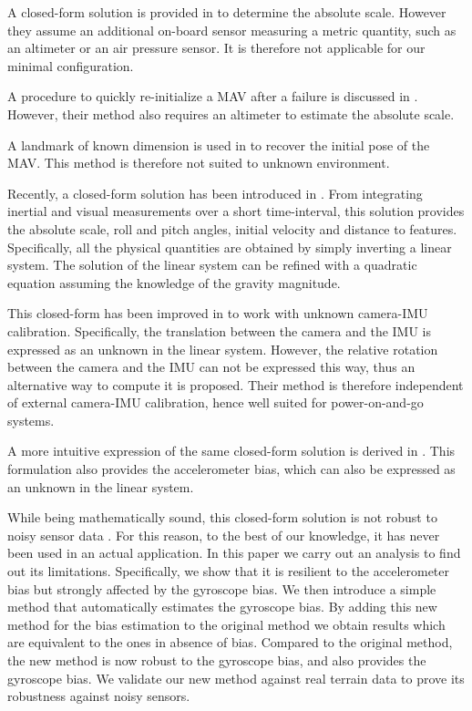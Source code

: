 \documentclass[letterpaper, 10 pt, conference]{ieeeconf}  %
\begin{document}


A closed-form solution is provided in \cite{Engel2013} to determine the absolute scale.
However they assume an additional on-board sensor measuring a metric quantity, such as an altimeter or an air pressure sensor.
It is therefore not applicable for our minimal configuration.

A procedure to quickly re-initialize a MAV after a failure is discussed in \cite{Faessler2015}.
However, their method also requires an altimeter to estimate the absolute scale.

A landmark of known dimension is used in \cite{Gemeiner2007} to recover the initial pose of the MAV.
This method is therefore not suited to unknown environment.

Recently, a closed-form solution has been introduced in \cite{Martinelli2012}.
From integrating inertial and visual measurements over a short time-interval, this solution provides the absolute scale, roll and pitch angles, initial velocity and distance to features.
Specifically, all the physical quantities are obtained by simply inverting a linear system.
The solution of the linear system can be refined with a quadratic equation assuming the knowledge of the gravity magnitude.

This closed-form has been improved in \cite{Li2013} to work with unknown camera-IMU calibration.
Specifically, the translation between the camera and the IMU is expressed as an unknown in the linear system.
However, the relative rotation between the camera and the IMU can not be expressed this way,
thus an alternative way to compute it is proposed.
Their method is therefore independent of external camera-IMU calibration, hence well suited for power-on-and-go systems.

A more intuitive expression of the same closed-form solution is derived in \cite{Martinelli2014}.
This formulation also provides the accelerometer bias, which can also be expressed as an unknown in the linear system.

While being mathematically sound, this closed-form solution is not robust to noisy sensor data \cite{Faessler2015}.
For this reason, to the best of our knowledge, it has never been used in an actual application.
In this paper we carry out an analysis to find out its limitations.
Specifically, we show that it is resilient to the accelerometer bias but strongly affected by the gyroscope bias.
We then introduce a simple method that automatically estimates the gyroscope bias.
By adding this new method for the bias estimation to the original method we obtain results which are equivalent to the ones in absence of bias.
Compared to the original method, the new method is now robust to the gyroscope bias, and also provides the gyroscope bias.
We validate our new method against real terrain data to prove its robustness against noisy sensors.
\end{document}
